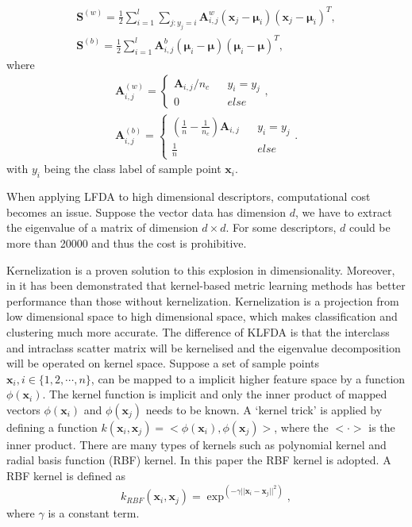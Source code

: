 \documentclass[10pt,twocolumn,letterpaper]{article}
\begin{document}
\begin{equation}
\begin{aligned}
\bm{S}^{(w)} = \frac{1}{2}\sum _{i=1}^l\sum_{j:y_j = i} \bm{A}_{i,j}^w (\bm{x}_j - \bm{\mu}_i)(\bm{x}_j - \bm{\mu}_i)^T, \\
\bm{S}^{(b)} =  \frac{1}{2}\sum _{i=1}^l \bm{A}_{i,j}^b(\bm{\mu}_i - \bm{\mu})(\bm{\mu}_i - \bm{\mu})^T,
\end{aligned}
\end{equation}
where 
\begin{equation}
\begin{aligned}
\bm{A}_{i,j}^{(w)} = \left \{ 
\begin{array}{rcl}
\bm{A}_{i,j}/n_c &  &y_i = y_j \\
0 & & else
\end{array}
  \right., \\
  \bm{A}_{i,j}^{(b)} = \left \{ 
\begin{array}{rcl}
(\frac{1}{n} - \frac{1}{n_c})  \bm{A}_{i,j} &  &{y_i = y_j }\\
\frac{1}{n} & & {else}
\end{array}
  \right..
 \end{aligned}
\end{equation}
with $y_i$ being the class label of sample point $\bm{x}_i$.
  
When applying LFDA to high dimensional descriptors, computational cost becomes an issue. Suppose the vector data has dimension $d$, we have to extract the eigenvalue of a matrix of dimension $d\times d$. For some descriptors, $d$ could be more than 20000 and thus the cost is prohibitive. 
 
 
Kernelization is a proven solution to this explosion in dimensionality. Moreover, in \cite{KernelVersionMetrics} it has been demonstrated that kernel-based metric learning methods has better performance than those without kernelization. Kernelization is a projection from low dimensional space to high dimensional space, which makes classification and clustering much more accurate. The difference of KLFDA is that the interclass and intraclass scatter matrix will be kernelised and the eigenvalue decomposition will be operated on kernel space.  Suppose a set of sample points $\bm{x}_i, i\in\{1,2,\cdots, n\} $, can be mapped to a implicit higher feature space by a function $\phi(\bm{x}_i)$. The kernel function is implicit and only the inner product of mapped vectors $\phi(\bm{x}_i)$ and $\phi(\bm{x}_j)$ needs to be known. A `kernel trick' is applied by defining a function $k(\bm{x}_i,\bm{x}_j) = <\phi(\bm{x}_i),\phi(\bm{x}_j)>$, where the $< \cdot >$ is the inner product. There are many types of kernels such as polynomial kernel and radial basis function (RBF) kernel. In this paper the RBF kernel is adopted. A RBF kernel is defined as 
\begin{equation}
k_{RBF}(\bm{x}_i,\bm{x}_j) = \exp^{(-\gamma||\bm{x}_i-\bm{x}_j||^2)}, 
\end{equation}
where $\gamma$ is a constant term.  
\end{document}
